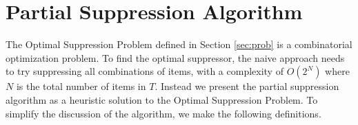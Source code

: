  \section{Partial Suppression Algorithm}
\label{sec:algo}

\renewcommand{\algorithmicforall}{\textbf{for each}}

The Optimal Suppression Problem defined in Section \ref{sec:prob} is
a combinatorial optimization problem. To find the optimal suppressor,
the naive approach needs to try suppressing all combinations of items,
with a complexity of $O(2^N)$ where $N$ is the total number of items in $T$.
Instead we present the partial suppression algorithm as a
heuristic solution to the Optimal Suppression Problem.
To simplify the discussion of the algorithm, we make the following
definitions.
%
